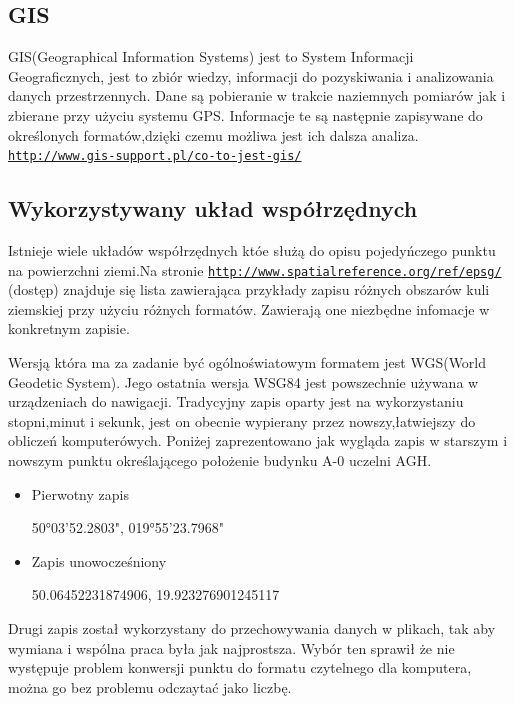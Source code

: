 \subsection{GIS}
\label{subsec:gis}

GIS(Geographical Information Systems) jest to System Informacji Geograficznych, jest to zbiór wiedzy, informacji do pozyskiwania i analizowania danych przestrzennych. Dane są pobieranie w trakcie naziemnych pomiarów jak i zbierane przy użyciu systemu GPS. Informacje te są następnie zapisywane do określonych formatów,dzięki czemu możliwa jest ich dalsza analiza. \underline{\texttt{http://www.gis-support.pl/co-to-jest-gis/}}


\subsection{Wykorzystywany układ współrzędnych}
\label{subsec:uklad}

Istnieje wiele układów współrzędnych któe służą do opisu pojedyńczego punktu na powierzchni ziemi.Na stronie \underline{\texttt{http://www.spatialreference.org/ref/epsg/}} (dostęp) znajduje się lista zawierająca przykłady zapisu różnych obszarów kuli ziemskiej przy użyciu różnych formatów. Zawierają one niezbędne infomacje w konkretnym zapisie.

Wersją która ma za zadanie być ogólnoświatowym formatem jest WGS(World Geodetic System). Jego ostatnia wersja  WSG84 jest powszechnie używana w urządzeniach do nawigacji.
Tradycyjny zapis oparty jest na wykorzystaniu stopni,minut i sekunk, jest on obecnie wypierany przez nowszy,łatwiejszy do obliczeń komputerówych. Poniżej zaprezentowano jak wygląda zapis w starszym i nowszym punktu określającego położenie budynku A-0 uczelni AGH.

\begin{itemize}

\item
Pierwotny zapis

50°03'52.2803", 019°55'23.7968"
\item
Zapis unowocześniony

50.06452231874906, 19.923276901245117
\end{itemize}

Drugi zapis został wykorzystany do przechowywania danych w plikach, tak aby wymiana i wspólna praca była jak najprostsza. Wybór ten sprawił że nie występuje problem konwersji punktu do formatu czytelnego dla komputera, można go bez problemu odczaytać jako liczbę.

